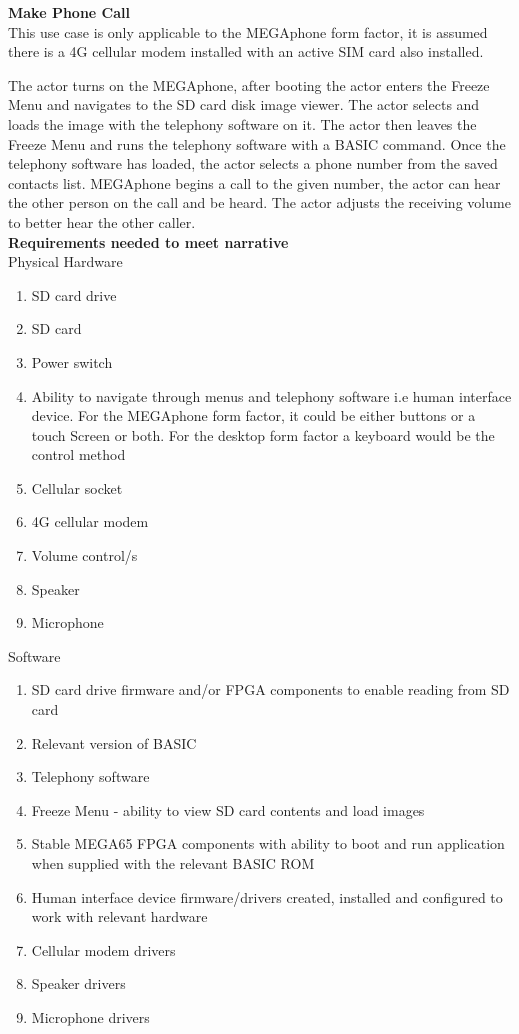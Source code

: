 \textbf{Make Phone Call}\\
This use case is only applicable to the MEGAphone form factor, it is assumed there is a 4G cellular modem installed with an active SIM card also installed.

The actor turns on the MEGAphone, after booting the actor enters the Freeze Menu and navigates to the SD card disk image viewer. The actor selects and loads the image with the telephony software on it. The actor then leaves the Freeze Menu and runs the telephony software with a BASIC command. Once the telephony software has loaded, the actor selects a phone number from the saved contacts list. MEGAphone begins a call to the given number, the actor can hear the other person on the call and be heard. The actor adjusts the receiving volume to better hear the other caller.\\

\textbf{Requirements needed to meet narrative}\\
Physical Hardware
\begin{enumerate}
\item SD card drive
\item SD card
\item Power switch
\item Ability to navigate through menus and telephony software i.e human interface device. For the MEGAphone form factor, it could be either buttons or a touch Screen or both. For the desktop form factor a keyboard would be the control method
\item Cellular socket
\item 4G cellular modem
\item Volume control/s
\item Speaker
\item Microphone
\end{enumerate}

Software\\
\begin{enumerate}
\item SD card drive firmware and/or FPGA components to enable reading from SD card
\item Relevant version of BASIC 
\item Telephony software
\item Freeze Menu - ability to view SD card contents and load images
\item Stable MEGA65 FPGA components with ability to boot and run application when supplied with the relevant BASIC ROM
\item Human interface device firmware/drivers created, installed and configured to work with relevant hardware
\item Cellular modem drivers
\item Speaker drivers
\item Microphone drivers
\end{enumerate}

